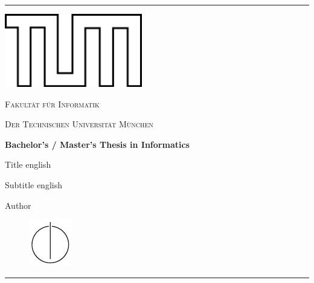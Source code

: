 \documentclass[a4paper,12pt,oneside]{scrreprt} %
\begin{document}
\thispagestyle{empty}
\begin{titlepage}

\begin{sffamily}
\begin{center}
	
	\rule{0.7\textwidth}{.4pt}

	\vspace{1cm}
	\includegraphics[width=6cm,angle=0]{TUMLogo_oZ_Outline_schwarz_RGB.png}

	\vspace{0.5cm}

	{\LARGE \textsc{Fakult\"at f\"ur Informatik}}

	\vspace{0.25cm}
	
	{\large \textsc{Der Technischen Universit\"at M\"unchen}}
	
	\vspace{1.0cm}
	
	{\Large {\textbf{Bachelor's / Master's Thesis in Informatics}}}
	
	\vspace{1.0cm}
	
	{\LARGE Title english}

	{\Large Subtitle english}

	\vspace{1cm}

	{\large Author}
	
	\vfill
	
	\begin{figure}[ht!]
		\centering
		\includegraphics[scale=1.5]{IN_schwarz_CMYK}
	\end{figure}
	
	\rule{0.7\textwidth}{.4pt}\\\medskip
	
\end{center}
\end{sffamily}

\end{titlepage}
\end{document}
